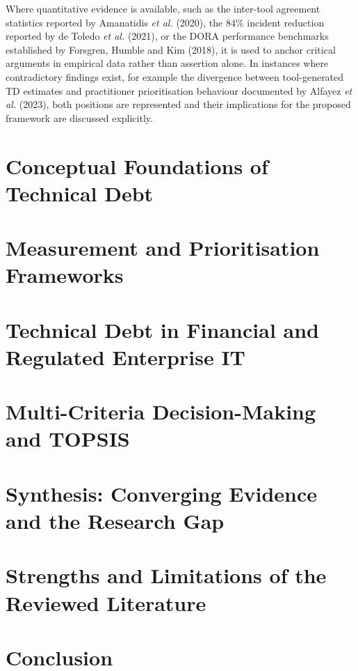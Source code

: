 \documentclass[
  11pt,
  letterpaper,
  11pt,
  oneside,
  english,
  onehalfspacing,
  headsepline]{MastersDoctoralThesis}
\begin{document}
Where quantitative evidence is available, such as the inter-tool
agreement statistics reported by Amanatidis \emph{et al.} (2020), the
84\% incident reduction reported by de Toledo \emph{et al.} (2021), or
the DORA performance benchmarks established by Forsgren, Humble and Kim
(2018), it is used to anchor critical arguments in empirical data rather
than assertion alone. In instances where contradictory findings exist,
for example the divergence between tool-generated TD estimates and
practitioner prioritisation behaviour documented by Alfayez \emph{et
al.} (2023), both positions are represented and their implications for
the proposed framework are discussed explicitly.

\section{Conceptual Foundations of Technical
Debt}\label{conceptual-foundations-of-technical-debt}

\section{Measurement and Prioritisation
Frameworks}\label{measurement-and-prioritisation-frameworks}

\section{Technical Debt in Financial and Regulated Enterprise
IT}\label{technical-debt-in-financial-and-regulated-enterprise-it}

\section{Multi-Criteria Decision-Making and
TOPSIS}\label{multi-criteria-decision-making-and-topsis}

\section{Synthesis: Converging Evidence and the Research
Gap}\label{synthesis-converging-evidence-and-the-research-gap}

\section{Strengths and Limitations of the Reviewed
Literature}\label{strengths-and-limitations-of-the-reviewed-literature}

\section{Conclusion}\label{conclusion}
\end{document}
